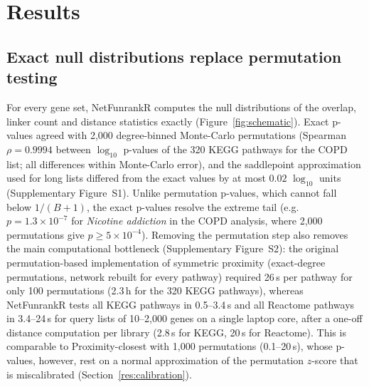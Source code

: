 \section{Results}

\subsection{Exact null distributions replace permutation testing}
For every gene set, NetFunrankR computes the null distributions of the overlap, linker count and distance statistics exactly (Figure~\ref{fig:schematic}). Exact p-values agreed with 2{,}000 degree-binned Monte-Carlo permutations (Spearman $\rho = 0.9994$ between $\log_{10}$ p-values of the 320 KEGG pathways for the COPD list; all differences within Monte-Carlo error), and the saddlepoint approximation used for long lists differed from the exact values by at most $0.02$ $\log_{10}$ units (Supplementary Figure~S1). Unlike permutation p-values, which cannot fall below $1/(B+1)$, the exact p-values resolve the extreme tail (e.g.\ $p = 1.3\times10^{-7}$ for \textit{Nicotine addiction} in the COPD analysis, where 2{,}000 permutations give $p \ge 5\times10^{-4}$). Removing the permutation step also removes the main computational bottleneck (Supplementary Figure~S2): the original permutation-based implementation of symmetric proximity (exact-degree permutations, network rebuilt for every pathway) required 26\,s per pathway for only 100 permutations (2.3\,h for the 320 KEGG pathways), whereas NetFunrankR tests all KEGG pathways in 0.5--3.4\,s and all Reactome pathways in 3.4--24\,s for query lists of 10--2{,}000 genes on a single laptop core, after a one-off distance computation per library (2.8\,s for KEGG, 20\,s for Reactome). This is comparable to Proximity-closest with 1{,}000 permutations (0.1--20\,s), whose p-values, however, rest on a normal approximation of the permutation $z$-score that is miscalibrated (Section~\ref{res:calibration}).

